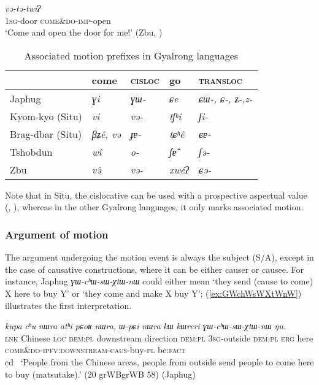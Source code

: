 \documentclass[oneside,a4paper,11pt]{article}
\newcommand{\ipa}[1]{{\phon\textit{#1}}}
\newcommand{\forme}[1]{\textit{\phon#1}}
\newcommand{\sens}[1]{‘#1’}
\newcommand{\rouge}[1]{{\color{red}#1}}
\begin{document}
\begin{exe}
\ex \label{ex:vEtEtwi}
\gll  \ipa{ɐ-kómʔ}	\ipa{\rouge{və}-tə-twíʔ} \\
\textsc{1sg}-door  \rouge{\textsc{come\&do}}-\textsc{imp}-open \\
\glt  \sens{Come and open the door for me!} (Zbu, \citealt{gong18these})
\end{exe}

\begin{table}[H]
\caption{Associated motion prefixes in Gyalrong languages} \centering \label{tab:am-gyalrong}
\begin{tabular}{lllll}
\toprule
&come & \textsc{cisloc} & go & \textsc{transloc} \\
\midrule
Japhug &  \ipa{ɣi} &\ipa{ɣɯ-} &\ipa{ɕe} &\ipa{ɕɯ-, ɕ-, ʑ-,z- } \\
Kyom-kyo (Situ) &\ipa{vi} &\ipa{və-} &\ipa{tʃʰi} &\ipa{ʃi-} \\
Brag-dbar (Situ) &\ipa{βʑê, və} &\ipa{ɟɐ-} &\ipa{tɕʰê} &\ipa{ɕɐ-} \\
Tshobdun & \ipa{wî}& \ipa{o-} &\ipa{ʃɐ̂} &\ipa{ʃə-} \\
Zbu & \ipa{və̂}& \ipa{və-} &\ipa{xwéʔ} &\ipa{ɕə-} \\
\bottomrule
\end{tabular}
\end{table}

Note that in Situ, the cislocative can be used with a prospective aspectual  value (\citealt{linyj03tense}, \citealt[204]{zhang16bragdbar}), whereas in the other Gyalrong languages, it only marks associated motion.

\subsubsection{Argument of motion}

The argument undergoing the motion event is always the subject (S/A), except in the case of causative constructions, where it can be either causer or causee. For instance, Japhug \forme{ɣɯ-cʰɯ-sɯ-χtɯ-nɯ} could either mean `they send (cause to come) X here to buy Y' or `they come and make X buy Y'; (\ref{ex:GWchWsWXtWnW}) illustrates the first interpretation.  

\begin{exe}
\ex \label{ex:GWchWsWXtWnW}
\gll \ipa{tɕe} 	\ipa{kupa} 	\ipa{cʰu} 	\ipa{nɯra} 	\ipa{atʰi} 	\ipa{pɕoʁ} 	\ipa{nɯra,} 	\ipa{ɯ-pɕi} 	\ipa{nɯra} 	\ipa{kɯ} 	\ipa{kɯreri} 	\ipa{\rouge{ɣɯ}-cʰɯ-sɯ-χtɯ-nɯ} 	\ipa{ŋu.}  \\
\textsc{lnk} Chinese \textsc{loc} \textsc{dem:pl} downstream direction \textsc{dem:pl} \textsc{3sg}-outside  \textsc{dem:pl}  \textsc{erg} here \textsc{\rouge{come\&do}-ipfv:downstream-caus}-buy-\textsc{pl} be:\textsc{fact} \\cd \
\glt \sens{People from the Chinese areas, people from outside send people to come here to buy (matsutake).} (20 grWBgrWB 58) (Japhug)
  \end{exe} 
\end{document}
